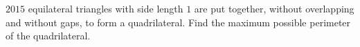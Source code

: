 $2015$ equilateral triangles with side length $1$ are put together, without overlapping and without gaps, to form a quadrilateral. Find the maximum possible perimeter of the quadrilateral.
